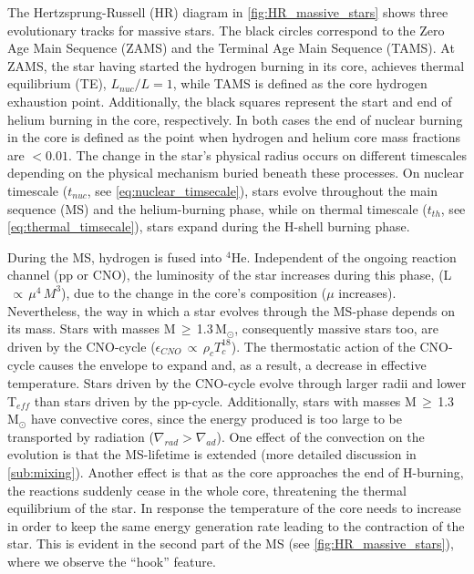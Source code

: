 The Hertzsprung-Russell (HR) diagram in \cref{fig:HR_massive_stars} shows three evolutionary tracks for massive stars. The black circles correspond to the Zero Age Main Sequence (ZAMS) and the Terminal Age Main Sequence (TAMS). At ZAMS, the star having started the hydrogen burning in its core, achieves thermal equilibrium (TE), $L_{nuc}/L =1$, while TAMS is defined as the core hydrogen exhaustion point. Additionally, the black squares represent the start and end of helium burning in the core, respectively. In both cases the end of nuclear burning in the core is defined as the point when hydrogen and helium core mass fractions are $< 0.01$. The change in the star's physical radius occurs on different timescales depending on the physical mechanism buried beneath these processes. On nuclear timescale ($t_{nuc}$, see \eqref{eq:nuclear_timsecale}), stars evolve throughout the main sequence (MS) and the helium-burning phase, while on thermal timescale ($t_{th}$, see \eqref{eq:thermal_timsecale}), stars expand during the H-shell burning phase.

During the MS, hydrogen is fused into $^4$He. Independent of the ongoing reaction channel (pp or CNO), the luminosity of the star increases during this phase, (L$\,\propto\,\mu^{4}\,M^3$), due to the change in the core's composition ($\mu$ increases). Nevertheless, the way in which a star evolves through the MS-phase depends on its mass. Stars with masses M\,$\geq$\,1.3\,M$_\odot$, consequently massive stars too, are driven by the CNO-cycle ($\epsilon_{CNO}\,\propto\,\rho_{c}T^{18}_{c}$). The thermostatic action of the CNO-cycle causes the envelope to expand and, as a result, a decrease in effective temperature. Stars driven by the CNO-cycle evolve through larger radii and lower T$_{eff}$ than stars driven by the pp-cycle. Additionally, stars with masses M\,$\geq$\,1.3\,M$_\odot$ have convective cores, since the energy produced is too large to be transported by radiation ($\nabla_{rad} > \nabla_{ad}$). One effect of the convection on the evolution is that the MS-lifetime is extended (more detailed discussion in \cref{sub:mixing}). Another effect is that as the core approaches the end of H-burning, the reactions suddenly cease in the whole core, threatening the thermal equilibrium of the star. In response the temperature of the core needs to increase in order to keep the same energy generation rate leading to the contraction of the star. This is evident in the second part of the MS (see \cref{fig:HR_massive_stars}), where we observe the ``hook'' feature. 

